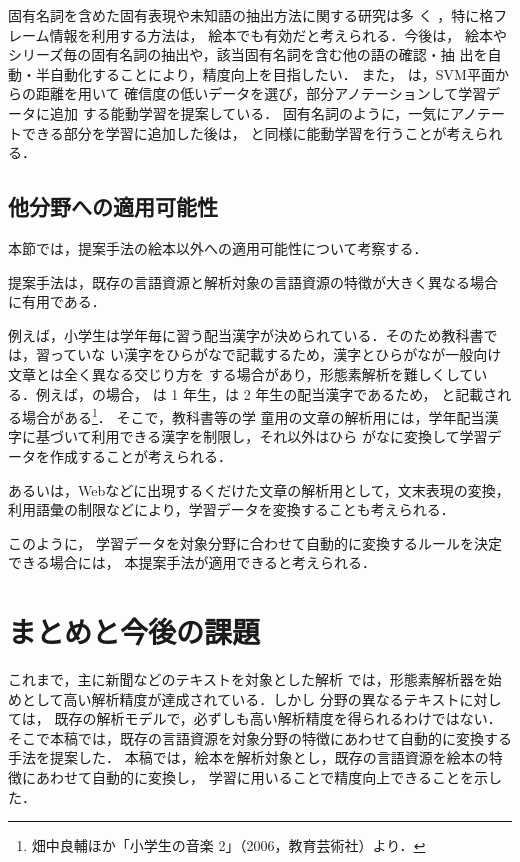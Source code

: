 \documentclass[japanese]{jnlp_1.4}
\begin{document}
固有名詞を含めた固有表現や未知語の抽出方法に関する研究は多
く\cite{Murawaki:Kurohashi:2010j,Katsuki:Sasano:Kawahara:Kurohashi:2011j,Sasano:Kurohashi:2007j}
，特に格フレーム情報を利用する方法\cite{Sasano:Kurohashi:2008j}は，
絵本でも有効だと考えられる．今後は，
絵本やシリーズ毎の固有名詞の抽出や，該当固有名詞を含む他の語の確認・抽
出を自動・半自動化することにより，精度向上を目指したい．
また，
は，SVM平面からの距離を用いて
確信度の低いデータを選び，部分アノテーションして学習データに追加
する能動学習を提案している．
固有名詞のように，一気にアノテートできる部分を学習に追加した後は，
と同様に能動学習を行うことが考えられる．


\subsection{他分野への適用可能性}
\label{sec:other}

本節では，提案手法の絵本以外への適用可能性について考察する．

提案手法は，既存の言語資源と解析対象の言語資源の特徴が大きく異なる場合
に有用である．

例えば，小学生は学年毎に習う配当漢字が決められている．そのため教科書では，習っていな
い漢字をひらがなで記載するため，漢字とひらがなが一般向け文章とは全く異なる交じり方を
する場合があり，形態素解析を難しくしている．例えば，\mbox{\jpn[音楽]{}}の場合，
\jpn[音]{}は 1 年生，\mbox{\jpn[楽]{}}は
2 年生の配当漢字であるため，\mbox{\jpn[音がく]{}}
と記載される場合がある\footnote{畑中良輔ほか「小学生の音楽 2」（2006，教育芸術社）より．}．
そこで，教科書等の学
童用の文章の解析用には，学年配当漢字に基づいて利用できる漢字を制限し，それ以外はひら
がなに変換して学習データを作成することが考えられる．


あるいは，Webなどに出現するくだけた文章の解析用として，文末表現の変換，
利用語彙の制限などにより，学習データを変換することも考えられる．

このように，
学習データを対象分野に合わせて自動的に変換するルールを決定できる場合には，
本提案手法が適用できると考えられる．


\section{まとめと今後の課題}
\label{sec:conclusion}

これまで，主に新聞などのテキストを対象とした解析
では，形態素解析器を始めとして高い解析精度が達成されている．しかし
分野の異なるテキストに対しては，
既存の解析モデルで，必ずしも高い解析精度を得られるわけではない．
そこで本稿では，既存の言語資源を対象分野の特徴にあわせて自動的に変換する手法を提案した．
本稿では，絵本を解析対象とし，既存の言語資源を絵本の特徴にあわせて自動的に変換し，
学習に用いることで精度向上できることを示した．
\end{document}

